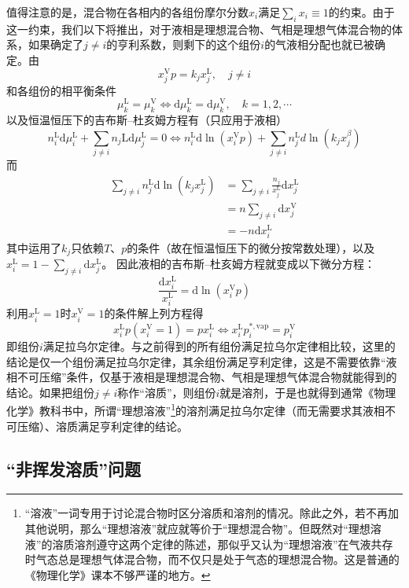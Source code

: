 \documentclass[main.tex]{subfiles}
\begin{document}
值得注意的是，混合物在各相内的各组份摩尔分数$x_i$满足$\sum_ix_i\equiv 1$的约束。由于这一约束，我们以下将推出，对于液相是理想混合物、气相是理想气体混合物的体系，如果确定了$j\neq i$的亨利系数，则剩下的这个组份$i$的气液相分配也就已被确定。由
\[x_j^\text{V}p=k_jx_j^\text{L},\quad j\neq i\]
和各组份的相平衡条件
\[\mu_k^\text{L}=\mu_k^\text{V}\Leftrightarrow \mathrm{d}\mu_k^\text{L}=\mathrm{d}\mu_k^\text{V},\quad k=1,2,\cdots\]
以及恒温恒压下的吉布斯--杜亥姆方程有（只应用于液相）
\[
    n_i^\text{L}\mathrm{d}\mu_i^\text{L}+\sum_{j\neq i}n_j\text{L}\mathrm{d}\mu_j^\text{L}=0\Leftrightarrow n_i^\text{L}\mathrm{d}\ln\left(x_i^\text{V}p\right)+\sum_{j\neq i}n_j^\text{L}d\ln\left(k_jx_j^\beta\right)
\]
而
\begin{align*}
    \sum_{j\neq i}n_j^\text{L}\mathrm{d}\ln\left(k_j x_j^\text{L}\right) & =\sum_{j\neq i}\frac{n_j}{x_j^\text{L}}\mathrm{d}x_j^\text{L} \\
                                                                         & =n\sum_{j\neq i}\mathrm{d}x_j^\text{V}                        \\
                                                                         & =-n\mathrm{d}x_i^\text{L}
\end{align*}
其中运用了$k_j$只依赖$T$、$p$的条件（故在恒温恒压下的微分按常数处理），以及$x_i^\text{L}=1-\sum_{j\neq i}\mathrm{d}x_j^\text{L}$。
因此液相的吉布斯--杜亥姆方程就变成以下微分方程：
\[\frac{\mathrm{d}x_i^\text{L}}{x_i^\text{L}}=\mathrm{d}\ln\left(x_i^\text{V}p\right)\]
利用$x_i^\text{L}=1$时$x_i^\text{V}=1$的条件解上列方程得
\[x_i^\text{L}p\left(x_i^\text{V}= 1\right)=p x_i^\text{L}\Leftrightarrow x_i^\text{L}p_i^{*,\text{vap}}=p^\text{V}_i\]
即组份$i$满足拉乌尔定律。与之前得到的所有组份满足拉乌尔定律相比较，这里的结论是仅一个组份满足拉乌尔定律，其余组份满足亨利定律，这是不需要依靠“液相不可压缩”条件，仅基于液相是理想混合物、气相是理想气体混合物就能得到的结论。如果把组份$j\neq i$称作“溶质”，则组份$i$就是溶剂，于是也就得到通常《物理化学》教科书中，所谓“理想溶液”\footnote{“溶液”一词专用于讨论混合物时区分溶质和溶剂的情况。除此之外，若不再加其他说明，那么“理想溶液”就应就等价于“理想混合物”。但既然对“理想溶液”的溶质溶剂遵守这两个定律的陈述，那似乎又认为“理想溶液”在气液共存时气态总是理想气体混合物，而不仅只是处于气态的理想混合物。这是普通的《物理化学》课本不够严谨的地方。}的溶剂满足拉乌尔定律（而无需要求其液相不可压缩）、溶质满足亨利定律的结论。

\subsection{“非挥发溶质”问题}
\end{document}
